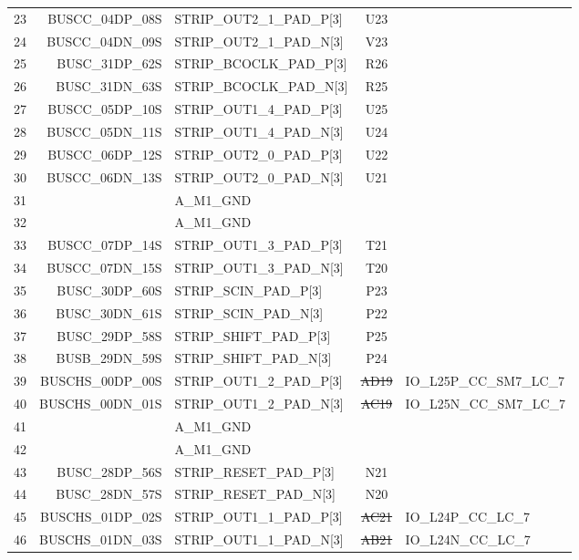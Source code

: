 \documentclass[11pt]{article}
\begin{document}
\begin{table}
\begin{center}
\begin{tabular}{|c|r|l|c|l|}
23 &  BUSCC\_04DP\_08S & STRIP\_OUT2\_1\_PAD\_P[3]   & U23 & \\
24 &  BUSCC\_04DN\_09S & STRIP\_OUT2\_1\_PAD\_N[3]   & V23 & \\ \hline
25 &   BUSC\_31DP\_62S & STRIP\_BCOCLK\_PAD\_P[3]   & R26 & \\
26 &   BUSC\_31DN\_63S & STRIP\_BCOCLK\_PAD\_N[3]   & R25 & \\ \hline
27 &  BUSCC\_05DP\_10S & STRIP\_OUT1\_4\_PAD\_P[3]   & U25 & \\
28 &  BUSCC\_05DN\_11S & STRIP\_OUT1\_4\_PAD\_N[3]   & U24 & \\ \hline
29 &  BUSCC\_06DP\_12S & STRIP\_OUT2\_0\_PAD\_P[3]   & U22 & \\
30 &  BUSCC\_06DN\_13S & STRIP\_OUT2\_0\_PAD\_N[3]   & U21 & \\ \hline
31 &                 & A\_M1\_GND                & & \\
32 &                 & A\_M1\_GND                & & \\ \hline
33 &  BUSCC\_07DP\_14S & STRIP\_OUT1\_3\_PAD\_P[3]   & T21 & \\
34 &  BUSCC\_07DN\_15S & STRIP\_OUT1\_3\_PAD\_N[3]   & T20 & \\ \hline
35 &   BUSC\_30DP\_60S & STRIP\_SCIN\_PAD\_P[3]     & P23 & \\
36 &   BUSC\_30DN\_61S & STRIP\_SCIN\_PAD\_N[3]     & P22 & \\ \hline
37 &   BUSC\_29DP\_58S & STRIP\_SHIFT\_PAD\_P[3]    & P25 & \\
38 &   BUSB\_29DN\_59S & STRIP\_SHIFT\_PAD\_N[3]    & P24 & \\ \hline
39 & BUSCHS\_00DP\_00S & STRIP\_OUT1\_2\_PAD\_P[3]   & \sout{AD19} & IO\_L25P\_CC\_SM7\_LC\_7 \\
40 & BUSCHS\_00DN\_01S & STRIP\_OUT1\_2\_PAD\_N[3]   & \sout{AC19} & IO\_L25N\_CC\_SM7\_LC\_7 \\ \hline
41 &                 & A\_M1\_GND                & & \\
42 &                 & A\_M1\_GND                & & \\ \hline
43 &   BUSC\_28DP\_56S & STRIP\_RESET\_PAD\_P[3]    & N21 & \\
44 &   BUSC\_28DN\_57S & STRIP\_RESET\_PAD\_N[3]    & N20 & \\ \hline
45 & BUSCHS\_01DP\_02S & STRIP\_OUT1\_1\_PAD\_P[3]   & \sout{AC21} & IO\_L24P\_CC\_LC\_7  \\
46 & BUSCHS\_01DN\_03S & STRIP\_OUT1\_1\_PAD\_N[3]   & \sout{AB21} & IO\_L24N\_CC\_LC\_7 \\ \hline

\end{tabular}
\end{center}
\end{table}
\end{document}
